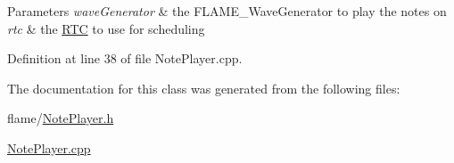 \begin{DoxyParams}{Parameters}
{\em wave\-Generator} & the F\-L\-A\-M\-E\-\_\-\-Wave\-Generator to play the notes on \\
\hline
{\em rtc} & the \hyperlink{classflame_1_1_r_t_c}{R\-T\-C} to use for scheduling \\
\hline
\end{DoxyParams}


Definition at line 38 of file Note\-Player.\-cpp.



The documentation for this class was generated from the following files\-:\begin{DoxyCompactItemize}
\item 
flame/\hyperlink{_note_player_8h}{Note\-Player.\-h}\item 
\hyperlink{_note_player_8cpp}{Note\-Player.\-cpp}\end{DoxyCompactItemize}

